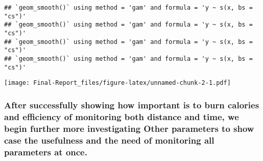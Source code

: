 \documentclass[
]{article}
\begin{document}
\begin{verbatim}
## `geom_smooth()` using method = 'gam' and formula = 'y ~ s(x, bs = "cs")'
## `geom_smooth()` using method = 'gam' and formula = 'y ~ s(x, bs = "cs")'
## `geom_smooth()` using method = 'gam' and formula = 'y ~ s(x, bs = "cs")'
## `geom_smooth()` using method = 'gam' and formula = 'y ~ s(x, bs = "cs")'
\end{verbatim}

\texttt{[image: Final-Report\_files/figure-latex/unnamed-chunk-2-1.pdf]}

\subsubsection{After successfully showing how important is to burn
calories and efficiency of monitoring both distance and time, we begin
further more investigating Other parameters to show case the usefulness
and the need of monitoring all parameters at
once.}\label{after-successfully-showing-how-important-is-to-burn-calories-and-efficiency-of-monitoring-both-distance-and-time-we-begin-further-more-investigating-other-parameters-to-show-case-the-usefulness-and-the-need-of-monitoring-all-parameters-at-once.}
\end{document}
